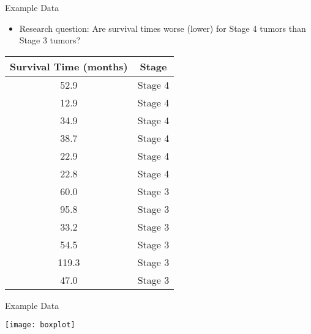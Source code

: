 \documentclass[xcolor=dvipsnames]{beamer}
\begin{document}
\begin{frame}{Example Data}
\begin{itemize}
	\item Research question: Are survival times worse (lower) for Stage 4 tumors than Stage 3 tumors? 
\end{itemize}
\begin{center}
	\begin{tabular}{|c|c|}
		\hline
		\textbf{Survival Time (months)} &  \textbf{Stage} \\ \hline \hline
		52.9  &Stage 4 \\ \hline
		12.9 &Stage 4 \\ \hline
		34.9& Stage 4 \\ \hline
		38.7 &Stage 4 \\ \hline
		22.9& Stage 4 \\ \hline
		22.8 &Stage 4 \\ \hline
		60.0 &Stage 3 \\ \hline
		95.8& Stage 3 \\ \hline
		33.2 &Stage 3 \\ \hline
		54.5 &Stage 3 \\ \hline
		119.3 &Stage 3 \\ \hline
		47.0 &Stage 3 \\ \hline
	\end{tabular}
\end{center}
\end{frame}

\begin{frame}{Example Data}
	\begin{center}
		\texttt{[image: boxplot]}
	\end{center}
\end{frame}
\end{document}

